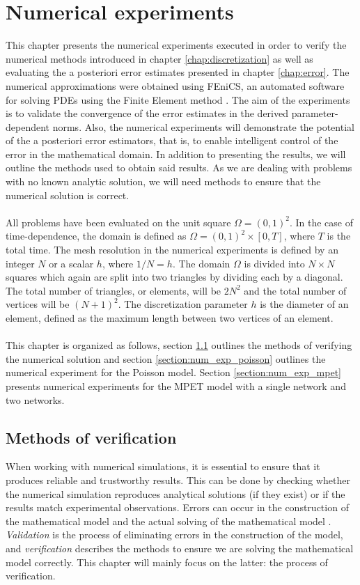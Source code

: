 \chapter{Numerical experiments}
\label{chap:experiments}
This chapter presents the numerical experiments executed in order to verify the numerical methods introduced in chapter \ref{chap:discretization} as well as evaluating the a posteriori error estimates presented in chapter \ref{chap:error}. The numerical approximations were obtained using FEniCS, an automated software for solving PDEs using the Finite Element method \cite{fenics}. The aim of the experiments is to validate the convergence of the error estimates in the derived parameter-dependent norms. Also, the numerical experiments will demonstrate the potential of the a posteriori error estimators, that is, to enable intelligent control of the error in the mathematical domain. In addition to presenting the results, we will outline the methods used to obtain said results. As we are dealing with problems with no known analytic solution, we will need methods to ensure that the numerical solution is correct. 
\\
\\
All problems have been evaluated on the unit square $\Omega = (0,1)^2$. In the case of time-dependence, the domain is defined as $\Omega = (0,1)^2 \times [0, T]$, where $T$ is the total time. The mesh resolution in the numerical experiments is defined by an integer $N$ or a scalar $h$, where  $1/N=h$. The domain $\Omega$ is divided into $N \times N$ squares which again are split into two triangles by dividing each by a diagonal. The total number of triangles, or elements, will be $2N^2$ and the total number of vertices will be $(N+1)^2$. The discretization parameter $h$ is the diameter of an element, defined as the maximum length between two vertices of an element.
\\
\\
This chapter is organized as follows, section \ref{section:verification} outlines the methods of verifying the numerical solution and section \ref{section:num_exp_poisson} outlines the numerical experiment for the Poisson model. Section \ref{section:num_exp_mpet} presents numerical experiments for the MPET model with a single network and two networks. 

\section{Methods of verification} \label{section:verification}
When working with numerical simulations, it is essential to ensure that it produces reliable and trustworthy results. This can be done by checking whether the numerical simulation reproduces analytical solutions (if they exist) or if the results match experimental observations. Errors can occur in the construction of the mathematical model and the actual solving of the mathematical model \cite{oberkampf}. \textit{Validation} is the process of eliminating errors in the construction of the model, and \textit{verification} describes the methods to ensure we are solving the mathematical model correctly. This chapter will mainly focus on the latter: the process of verification. 


